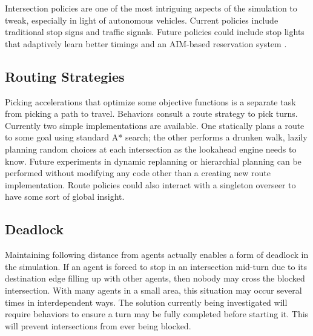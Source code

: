 \documentclass[letterpaper, 10 pt, conference]{ieeeconf}  %
\begin{document}
Intersection policies are one of the most intriguing aspects of the simulation
to tweak, especially in light of autonomous vehicles. Current policies include
traditional stop signs and traffic signals. Future policies could include stop
lights that adaptively learn better timings and an AIM-based reservation system
\cite{JAIR08-dresner}. 




\subsection{Routing Strategies}

Picking accelerations that optimize some objective functions is a separate task
from picking a path to travel. Behaviors consult a route strategy to pick turns.
Currently two simple implementations are available. One statically plans a route
to some goal using standard A* search; the other performs a drunken walk, lazily
planning random choices at each intersection as the lookahead engine needs to
know. Future experiments in dynamic replanning or hierarchial planning can be
performed without modifying any code other than a creating new route
implementation. Route policies could also interact with a singleton overseer to
have some sort of global insight.

\subsection{Deadlock}

Maintaining following distance from agents actually enables a form of deadlock
in the simulation. If an agent is forced to stop in an intersection mid-turn due
to its destination edge filling up with other agents, then nobody may cross the
blocked intersection. With many agents in a small area, this situation may
occur several times in interdependent ways. The solution currently being
investigated will require behaviors to ensure a turn may be fully completed
before starting it. This will prevent intersections from ever being blocked.
\end{document}
